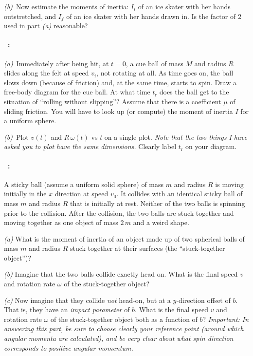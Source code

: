 \documentclass[12pt]{article}
\begin{document}
\textsl{(b)}~Now estimate the moments of inertia: $I_i$ of an ice
skater with her hands outstretched, and $I_f$ of an ice skater with
her hands drawn in.  Is the factor of 2 used in part \textsl{(a)}
reasonable?

\paragraph{\problemname~\theproblem:}\label{cue}%
\textsl{(a)}~Immediately after being hit, at $t=0$, a cue ball of mass
$M$ and radius $R$ slides along the felt at speed $v_i$, not rotating
at all.  As time goes on, the ball slows down (because of friction)
and, at the same time, starts to spin.  Draw a free-body diagram for
the cue ball.  At what time $t_\mathrm{r}$ does the ball get to the
situation of ``rolling without slipping''?  Assume that there is a
coefficient $\mu$ of sliding friction. You will have to look up (or
compute) the moment of inertia $I$ for a uniform sphere.

\textsl{(b)}~Plot $v(t)$ and $R\,\omega(t)$ vs $t$ on a single plot.
\emph{Note that the two things I have asked you to plot have the same
dimensions.}  Clearly label $t_\mathrm{r}$ on your diagram.

\paragraph{\problemname~\theproblem:}%
A sticky ball (assume a uniform solid sphere) of mass $m$ and radius
$R$ is moving initially in the $x$ direction at speed $v_0$. It
collides with an identical sticky ball of mass $m$ and radius $R$ that
is initially at rest.  Neither of the two balls is spinning prior to
the collision.  After the collision, the two balls are stuck together
and moving together as one object of mass $2\,m$ and a weird shape.

\textsl{(a)} What is the moment of inertia of an object made up of two
spherical balls of mass $m$ and radius $R$ stuck together at their
surfaces (the ``stuck-together object'')?

\textsl{(b)} Imagine that the two balls collide exactly head on.  What
is the final speed $v$ and rotation rate $\omega$ of the
stuck-together object?

\textsl{(c)} Now imagine that they collide \emph{not} head-on, but at
a $y$-direction offset of $b$. That is, they have an \emph{impact
parameter} of $b$. What is the final speed $v$ and rotation rate
$\omega$ of the stuck-together object both as a function of $b$?
\textsl{Important: In answering this part, be sure to choose clearly
  your reference point (around which angular momenta are calculated),
  and be very clear about what spin direction corresponds to positive
  angular momentum.}
\end{document}
